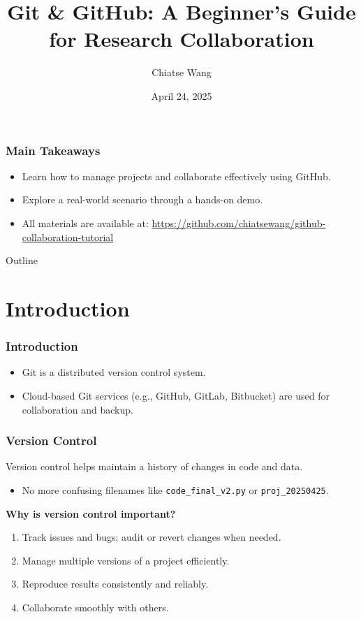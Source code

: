 \documentclass[12pt]{beamer}
\title[Git Tutorial]{Git \& GitHub: A Beginner's Guide for Research Collaboration}
\author{Chiatse Wang}
\institute[ISS AS]{Institute of Statistical Science, Academia Sinica}
\date{April 24, 2025}
\begin{document}
\begin{frame}
  \titlepage
\end{frame}

\begin{frame}
  \frametitle{Main Takeaways}
  \begin{itemize}
    \setlength\itemsep{1em}
    \item Learn how to manage projects and collaborate effectively using GitHub.
    \item Explore a real-world scenario through a hands-on demo.
    \item All materials are available at: \url{https://github.com/chiatsewang/github-collaboration-tutorial}
  \end{itemize}
\end{frame}

\begin{frame}{Outline}
  \tableofcontents
\end{frame}

\section{Introduction}

\begin{frame}
  \frametitle{Introduction}
  \begin{itemize}
    \setlength\itemsep{1em}
    \item Git is a distributed version control system.
    \item Cloud-based Git services (e.g., GitHub, GitLab, Bitbucket) are used for collaboration and backup.
  \end{itemize}
\end{frame}

\begin{frame}
  \frametitle{Version Control}

  Version control helps maintain a history of changes in code and data.
  \begin{itemize}
    \setlength\itemsep{1em}
    \item No more confusing filenames like \texttt{code\_final\_v2.py} or \texttt{proj\_20250425}.
  \end{itemize}
  
  \vspace{1em}
  \textbf{Why is version control important?}
  \vspace{1em}

  \begin{enumerate}
    \setlength\itemsep{1em}
    \item Track issues and bugs; audit or revert changes when needed.
    \item Manage multiple versions of a project efficiently.
    \item Reproduce results consistently and reliably.
    \item Collaborate smoothly with others.
  \end{enumerate}
\end{frame}
\end{document}
